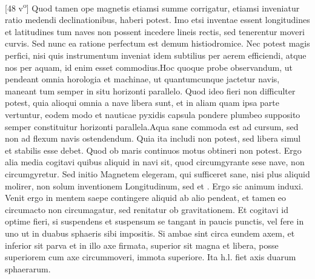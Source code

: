 [48 v\textsuperscript{o}] Quod tamen ope magnetis\protect{} etiamsi summe corrigatur, etiamsi inveniatur ratio medendi declinationibus, haberi  potest. Imo etsi inventae essent longitudines\protect{} et latitudines\protect{} tum naves\protect{} non possent incedere lineis rectis, sed tenerentur moveri curvis. Sed nunc ea ratione perfectum est demum histiodromice. Nec potest magis perfici, nisi quis instrumentum inveniat idem subtilius per aerem efficiendi, atque nos per aquam, id enim esset commodius.\pend \pstart Hoc quoque probe observandum, ut pendeant omnia horologia\protect{} et machinae, ut quantumcunque jactetur navis, maneant tum semper in situ horizonti parallelo. Quod ideo fieri non difficulter potest, quia alioqui omnia a nave\protect{} libera sunt, et in aliam quam ipsa parte vertuntur, eodem modo et nauticae pyxidis\protect{} capsula pondere plumbeo supposito semper constituitur horizonti parallela.\pend \pstart Aqua sane commoda est ad cursum, sed non ad flexum navis\protect{} ostendendum. Quia ita includi non potest, sed libera simul et stabilis esse debet. Quod ob maris continuos motus obtineri non potest. Ergo alia media cogitavi quibus aliquid in navi sit, quod circumgyrante sese nave, non circumgyretur. Sed initio Magnetem\protect{} elegeram, qui sufficeret sane, nisi plus aliquid molirer, non solum inventionem Longitudinum\protect{}, sed et . Ergo sic animum induxi. Venit ergo in mentem saepe contingere  aliquid ab alio pendeat, et tamen eo circumacto non circumagatur, sed renitatur ob gravitationem\protect{}. Et cogitavi id optime fieri, si suspendens et suspensum se tangant in paucis punctis, vel fere in uno ut in duabus sphaeris sibi impositis. Si ambae sint circa eundem axem, et inferior sit parva et in illo axe firmata, superior sit magna et libera, posse superiorem cum axe circummoveri, immota superiore. Ita h.l. fiet axis duarum sphaerarum.\label{fig3}
